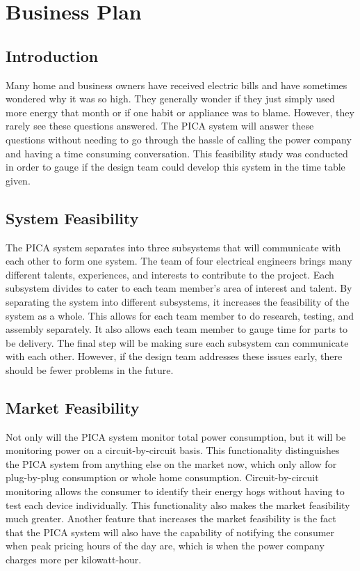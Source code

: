 \section{Business Plan}
\subsection{Introduction}
Many home and business owners have received electric bills and have sometimes wondered why it was so high. They generally wonder if they just simply used more energy that month or if one habit or appliance was to blame. However, they rarely see these questions answered. The PICA system will answer these questions without needing to go through the hassle of calling the power company and having a time consuming conversation. This feasibility study was conducted in order to gauge if the design team could develop this system in the time table given.  

\subsection{System Feasibility}
The PICA system separates into three subsystems that will communicate with each other to form one system. The team of four electrical engineers brings many different talents, experiences, and interests to contribute to the project. Each subsystem divides to cater to each team member’s area of interest and talent. By separating the system into different subsystems, it increases the feasibility of the system as a whole. This allows for each team member to do research, testing, and assembly separately. It also allows each team member to gauge time for parts to be delivery. The final step will be making sure each subsystem can communicate with each other. However, if the design team addresses these issues early, there should be fewer problems in the future. 

\subsection{Market Feasibility}
Not only will the PICA system monitor total power consumption, but it will be monitoring power on a circuit-by-circuit basis. This functionality distinguishes the PICA system from anything else on the market now, which only allow for plug-by-plug consumption or whole home consumption. Circuit-by-circuit monitoring allows the consumer to identify their energy hogs without having to test each device individually. This functionality also makes the market feasibility much greater. Another feature that increases the market feasibility is the fact that the PICA system will also have the capability of notifying the consumer when peak pricing hours of the day are, which is when the power company charges more per kilowatt-hour. 

